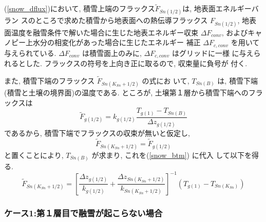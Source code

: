 (\ref{snow_dflux})において,
積雪上端のフラックス$ \widetilde{F}_{Sn(1/2)}$は, 地表面エネルギーバラン
スのところで求めた積雪から地表面への熱伝導フラックス $F_{Sn(1/2)}$, 地表
面温度を融雪条件で解いた場合に生じた地表エネルギー収束 $\Delta
F_{conv}$, およびキャノピー上水分の相変化があった場合に生じたエネルギー
補正 $\Delta F_{c,conv}$ を用いて与えられている.
$\Delta F_{conv}$ は積雪面上のみに, $\Delta F_{c,conv}$ はグリッドに一様
に与えられるとした. フラックスの符号を上向き正に取るので, 収束量に負号が
付く.

また, 積雪下端のフラックス $\widetilde{F}_{Sn(K_{Sn}+1/2)}$ の式にお
いて, $T_{Sn(B)}$ は, 積雪下端(積雪と土壌の境界面)の温度である.
ところが, 土壌第１層から積雪下端へのフラックスは
\begin{equation}
\widetilde{F}_{g(1/2)} = k_{g(1/2)} \frac{T_{g(1)}-T_{Sn(B)}}{\Delta z_{g(1/2)}}
\end{equation}
であるから, 積雪下端でフラックスの収束が無いと仮定し,
\begin{equation}
\widetilde{F}_{Sn(K_{Sn}+1/2)} =  \widetilde{F}_{g(1/2)}
\end{equation}
と置くことにより, $T_{Sn(B)}$ が求まり, これを(\ref{snow_btm}) に代入
して以下を得る.
\begin{equation}
\widetilde{F}_{Sn(K_{Sn}+1/2)} =
\left[\frac{\Delta z_{g(1/2)}}{k_{g(1/2)}}
+\frac{\Delta z_{Sn(K_{Sn}+1/2)}}{k_{Sn(K_{Sn}+1/2)}}
\right]^{-1}
(T_{g(1)} - T_{Sn(K_{Sn})})
\label{snow_btm}
\end{equation}

\subsubsection{ケース1:第１層目で融雪が起こらない場合}

